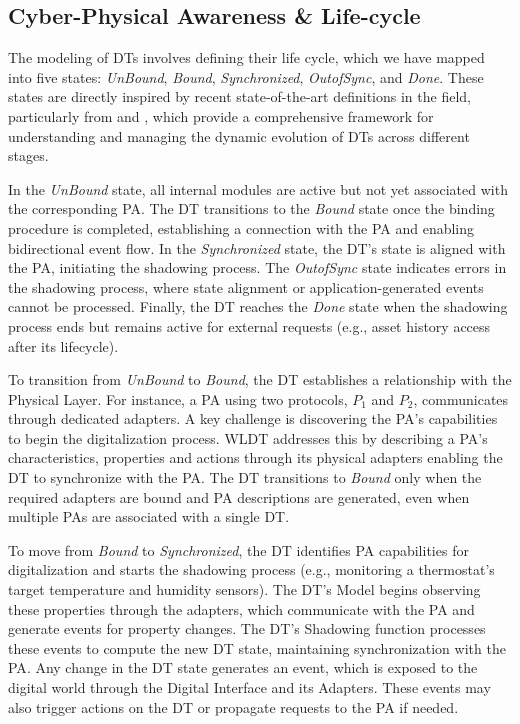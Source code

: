 \subsection{Cyber-Physical Awareness \& Life-cycle}
\label{sec:dt-lifecycle}

The modeling of DTs involves defining their life cycle, which we have mapped into five states: \textit{UnBound}, \textit{Bound}, \textit{Synchronized}, \textit{OutofSync}, and \textit{Done}.
These states are directly inspired by recent state-of-the-art definitions in the field, particularly from \cite{web_of_dt} and \cite{bellavista2023requirements}, which provide a comprehensive framework for understanding and managing the dynamic evolution of DTs across different stages.

In the \textit{UnBound} state, all internal modules are active but not yet associated with the corresponding \ac{PA}.
The DT transitions to the \textit{Bound} state once the binding procedure is completed, establishing a connection with the \ac{PA} and enabling bidirectional event flow.
In the \textit{Synchronized} state, the DT’s state is aligned with the \ac{PA}, initiating the shadowing process.
The \textit{OutofSync} state indicates errors in the shadowing process, where state alignment or application-generated events cannot be processed.
Finally, the DT reaches the \textit{Done} state when the shadowing process ends but remains active for external requests (e.g., asset history access after its lifecycle).

To transition from \textit{UnBound} to \textit{Bound}, the DT establishes a relationship with the Physical Layer.
For instance, a \ac{PA} using two protocols, $P_1$ and $P_2$, communicates through dedicated adapters.
A key challenge is discovering the \ac{PA}’s capabilities to begin the digitalization process. WLDT addresses this by describing a \ac{PA}’s characteristics, properties and actions through its physical adapters enabling the DT to synchronize with the \ac{PA}.
The DT transitions to \textit{Bound} only when the required adapters are bound and \ac{PA} descriptions are generated, even when multiple \ac{PA}s are associated with a single DT.

To move from \textit{Bound} to \textit{Synchronized}, the DT identifies \ac{PA} capabilities for digitalization and starts the shadowing process (e.g., monitoring a thermostat's target temperature and humidity sensors).
The DT’s Model begins observing these properties through the adapters, which communicate with the \ac{PA} and generate events for property changes.
The DT’s Shadowing function processes these events to compute the new DT state, maintaining synchronization with the \ac{PA}.
Any change in the DT state generates an event, which is exposed to the digital world through the Digital Interface and its Adapters.
These events may also trigger actions on the DT or propagate requests to the \ac{PA} if needed.


